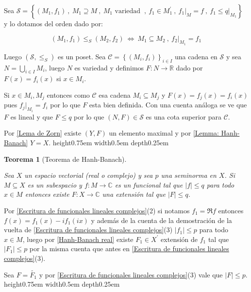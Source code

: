 \documentclass[11pt]{article}
\newcommand{\C}{\mathbb{C}}
\newcommand{\R}{{\mathbb{R}}}
\newcommand{\abs}[1]{\left\lvert#1\right\rvert}
\newcommand{\sett}[1]{\left\lbrace#1\right\rbrace}
\newcommand{\Bigcup}[2]{\bigcup\limits_{#1}{#2}}
\newtheorem{theorem}{Teorema}
\numberwithin{theorem}{subsection}
\newenvironment{proof}[1][Demostraci\'on]{\begin{trivlist}
		\item[\hskip \labelsep {\bfseries #1}]}{\end{trivlist}}
\newcommand{\qed}{\nobreak \ifvmode \relax \else
	\ifdim\lastskip<1.5em \hskip-\lastskip
	\hskip1.5em plus0em minus0.5em \fi \nobreak
	\vrule height0.75em width0.5em depth0.25em\fi}
\begin{document}
\begin{proof}
	Sea $\mathcal{S} = \sett{(M_1,f_1) \ , \ M_1 \supseteq M \ , \ M_1\text{ variedad } \ , \ f_1 \in M_1^{'} \ , \ f_1 \vert_{M} = f \ , \ f_1 \leq q \vert_{M_1}}$ y lo dotamos del orden dado por:
	
	\[
	(M_1,f_1) \leq_S (M_2,f_2) \ \Longleftrightarrow \ M_1 \subseteq M_2 \ , \ f_2 \vert_{M_1} = f_1
	\]
	
	Luego $(\mathcal{S}, \leq_S)$ es un poset. Sea $\mathcal{C} = \sett{(M_i,f_i)}_{i \in I}$ una cadena en $\mathcal{S}$ y sea $N = \Bigcup{i \in I}{M_i}$, luego $N$ es variedad y definimos $F: N \rightarrow \R$ dado por $F(x) = f_i(x)$ si $x \in M_i$.
	
	Si $x \in M_i,M_j$ entonces como $\mathcal{C}$ esa cadena $M_i \subseteq M_j$ y $F(x) = f_j(x) = f_i(x)$ pues $f_j \vert_{M_i} = f_i$ por lo que $F$ esta bien definida. Con una cuenta an\'aloga se ve que $F$ es lineal y que $F \leq q$ por lo que $(N,F) \in \mathcal{S}$ es una cota superior para $\mathcal{C}$.
	
	Por \ref{Lema de Zorn} existe $(Y,F)$ un elemento maximal y por \ref{Lemma: Hanh-Banach} $Y = X$. \qed
	
\end{proof}

\begin{theorem}[Teorema de Hanh-Banach]
	\label{Hanh-Banach}
	
	Sea $X$ un espacio vectorial (real o complejo) y sea $p$ una seminorma en $X$. Si $M \subseteq X$ es un subespacio y $f : M \rightarrow \C$ es un funcional tal que $\abs{f} \leq q$ para todo $x \in M$ entonces existe $F : X \rightarrow \C$ una extensi\'on tal que $\abs{F} \leq q$.
\end{theorem}

\begin{proof}
	Por \ref{Escritura de funcionales lineales complejos}(2) si notamos $f_1 = \Re f$ entonces $f(x) = f_1(x) - i f_1(ix)$ y adem\'as de la cuenta de la demostraci\'on de la vuelta de  \ref{Escritura de funcionales lineales complejos}(3) $\abs{f_1} \leq p$ para todo $x \in M$, luego por \ref{Hanh-Banach real} existe $F_1 \in X^{'}$ extensi\'on de $f_1$ tal que $\abs{F_1} \leq p$ por la misma cuenta que antes en \ref{Escritura de funcionales lineales complejos}(3).
	
	Sea $F = \tilde{F_1}$ y por \ref{Escritura de funcionales lineales complejos}(3) vale que $\abs{F} \leq p$. \qed
\end{proof}
\end{document}
